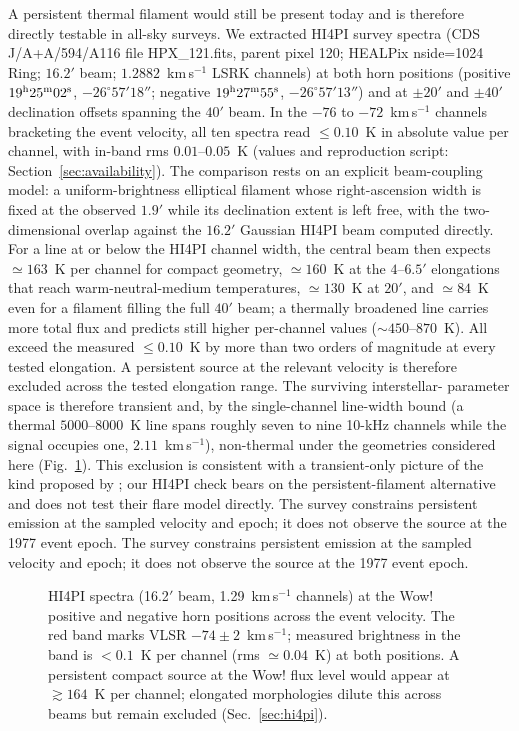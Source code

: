 \documentclass[twocolumn]{aastex701}
\begin{document}
A persistent thermal filament would still be present today and is therefore directly testable in all-sky  surveys. We extracted HI4PI survey spectra \citep{hi4pi2016} (CDS J/A+A/594/A116 file HPX\_121.fits, parent pixel 120; HEALPix nside=1024 Ring; $16.2'$ beam; $1.2882$~km\,s$^{-1}$ LSRK channels) at both horn positions (positive $19^{\rm h}25^{\rm m}02^{\rm s}$, $-26^\circ57'18''$; negative $19^{\rm h}27^{\rm m}55^{\rm s}$, $-26^\circ57'13''$) and at $\pm20'$ and $\pm40'$ declination offsets spanning the $40'$ beam. In the $-76$ to $-72$~km\,s$^{-1}$ channels bracketing the event velocity, all ten spectra read $\leq0.10$~K in absolute value per channel, with in-band rms $0.01$--$0.05$~K (values and reproduction script: Section~\ref{sec:availability}). The comparison rests on an explicit beam-coupling model: a uniform-brightness elliptical filament whose right-ascension width is fixed at the observed $1.9'$ while its declination extent is left free, with the two-dimensional overlap against the $16.2'$ Gaussian HI4PI beam computed directly. For a line at or below the HI4PI channel width, the central beam then expects $\simeq163$~K per channel for compact geometry, $\simeq160$~K at the $4$--$6.5'$ elongations that reach warm-neutral-medium temperatures, $\simeq130$~K at $20'$, and $\simeq84$~K even for a filament filling the full $40'$ beam; a thermally broadened line carries more total flux and predicts still higher per-channel values ($\sim450$--$870$~K). All exceed the measured $\leq0.10$~K by more than two orders of magnitude at every tested elongation. A persistent source at the relevant velocity is therefore excluded across the tested elongation range. The surviving interstellar- parameter space is therefore transient and, by the single-channel line-width bound (a thermal $5000$--$8000$~K line spans roughly seven to nine 10-kHz channels while the signal occupies one, $2.11$~km\,s$^{-1}$), non-thermal under the geometries considered here (Fig.~\ref{fig:hi4pi}). This exclusion is consistent with a transient-only picture of the kind proposed by \citet{mendez2024}; our HI4PI check bears on the persistent-filament alternative and does not test their flare model directly. The survey constrains persistent emission at the sampled velocity and epoch; it does not observe the source at the 1977 event epoch. The survey constrains persistent emission at the sampled velocity and epoch; it does not observe the source at the 1977 event epoch.

\begin{figure}[ht!]
\caption{HI4PI spectra (16.2$'$ beam, 1.29~km\,s$^{-1}$ channels) at the Wow! positive and negative horn positions across the event velocity. The red band marks VLSR $-74\pm2$~km\,s$^{-1}$; measured brightness in the band is $<0.1$~K per channel (rms $\simeq0.04$~K) at both positions. A persistent compact source at the Wow! flux level would appear at $\gtrsim164$~K per channel; elongated morphologies dilute this across beams but remain excluded (Sec.~\ref{sec:hi4pi}).}
\label{fig:hi4pi}
\end{figure}
\end{document}

